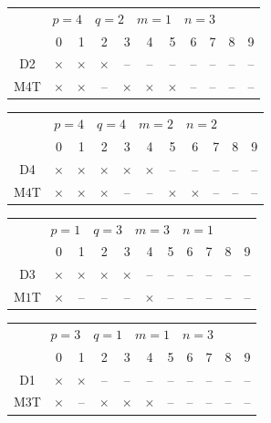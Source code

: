 \documentclass[11pt]{article}
\begin{document}
\begin{table}[ht!]
\vspace{1em}\hspace{1mm}
\begin{tabular}{ccccccccccc}
\multicolumn{11}{c}{\quad\quad\quad$\boxed{p=4\quad q=2\quad m=1 \quad n=3}$}\\[4pt]
& 0 & 1 & 2 & 3 & 4 & 5 & 6 & 7 & 8 & 9 \\
D2& $\times$ & $\times$ & $\times$ & -- & -- & -- & -- & -- & -- & -- \\
M4T& $\times$ & $\times$ & -- & $\times$ & $\times$ & $\times$ & -- & -- & -- & -- \\
\end{tabular}\hspace{2em}
\begin{tabular}{ccccccccccc}
\multicolumn{11}{c}{\quad\quad\quad\!\!$\boxed{p=4 \quad q=4 \quad m=2 \quad n=2}$}\\[2pt]
& 0 & 1 & 2 & 3 & 4 & 5 & 6 & 7 & 8 & 9 \\
D4 & $\times$ & $\times$ & $\times$ & $\times$ & $\times$ & -- & -- & -- & -- & -- \\
M$4$T & $\times$ & $\times$ &$\times$ & -- & -- & $\times$ & $\times$ & -- & -- & --  \\
\end{tabular}

\vspace{1em}\hspace{1mm}
\begin{tabular}{ccccccccccc}
\multicolumn{11}{c}{\quad\quad\quad$\boxed{p=1 \quad q=3 \quad m=3 \quad n=1}$}\\[2pt]
& 0 & 1 & 2 & 3 & 4 & 5 & 6 & 7 & 8 & 9 \\
 D3& $\times$ & $\times$ & $\times$ & $\times$ & -- & -- & -- & -- & -- & -- \\
 M$1$T& $\times$ & --  & -- & -- & $\times$ & -- & -- & -- & -- & -- \\
\end{tabular}\hspace{2em}
\begin{tabular}{ccccccccccc}
\multicolumn{11}{c}{\quad\quad\quad$\boxed{p=3 \quad q=1 \quad m=1 \quad n=3}$}\\[2pt]
& 0 & 1 & 2 & 3 & 4 & 5 & 6 & 7 & 8 & 9 \\
 D1& $\times$ & $\times$ & -- & -- & -- & -- & -- & -- & -- & -- \\
 M3T& $\times$ & -- & $\times$ & $\times$ & $\times$ & --  & -- & -- & -- & -- \\
\end{tabular}


\end{table}
\end{document}
